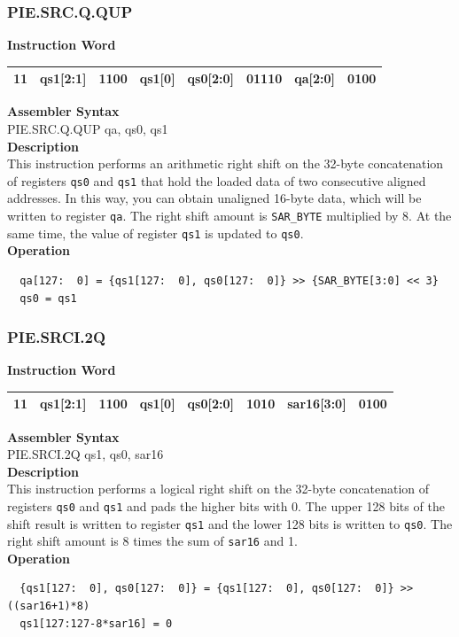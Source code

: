 \newpage
\subsubsection{PIE.SRC.Q.QUP}\label{instruction:PIESRCQQUP}
\setlength\tabcolsep{6pt}
\textbf{Instruction Word} \\
\begin{tabular}{|c|c|c|c|c|c|c|c|}
	\hline
	11 & qs1[2:1] & 1100 & qs1[0] & qs0[2:0] & 01110 & qa[2:0] & 0100 \\
	\hline
\end{tabular}

\textbf{Assembler Syntax} \\
PIE.SRC.Q.QUP qa, qs0, qs1 \\
\textbf{Description} \\
This instruction performs an arithmetic right shift on the 32-byte concatenation of registers \lstinline{qs0} and \lstinline{qs1} that hold the loaded data of two consecutive aligned addresses. In this way, you can obtain unaligned 16-byte data, which will be written to register \lstinline{qa}. The right shift amount is \lstinline{SAR_BYTE} multiplied by 8. At the same time, the value of register \lstinline{qs1} is updated to \lstinline{qs0}.\\
\textbf{Operation}
\begin{lstlisting}
  qa[127:  0] = {qs1[127:  0], qs0[127:  0]} >> {SAR_BYTE[3:0] << 3}
  qs0 = qs1
\end{lstlisting}

\newpage
\subsubsection{PIE.SRCI.2Q}\label{instruction:PIESRCI2Q}
\setlength\tabcolsep{6pt}
\textbf{Instruction Word} \\
\begin{tabular}{|c|c|c|c|c|c|c|c|}
	\hline
	11 & qs1[2:1] & 1100 & qs1[0] & qs0[2:0] & 1010 & sar16[3:0] & 0100 \\
	\hline
\end{tabular}

\textbf{Assembler Syntax} \\
PIE.SRCI.2Q qs1, qs0, sar16 \\
\textbf{Description} \\
This instruction performs a logical right shift on the 32-byte concatenation of registers \lstinline{qs0} and \lstinline{qs1} and pads the higher bits with 0. The upper 128 bits of the shift result is written to register \lstinline{qs1} and the lower 128 bits is written to \lstinline{qs0}. The right shift amount is 8 times the sum of \lstinline{sar16} and 1.\\
\textbf{Operation}
\begin{lstlisting}
  {qs1[127:  0], qs0[127:  0]} = {qs1[127:  0], qs0[127:  0]} >> ((sar16+1)*8)
  qs1[127:127-8*sar16] = 0
\end{lstlisting}

